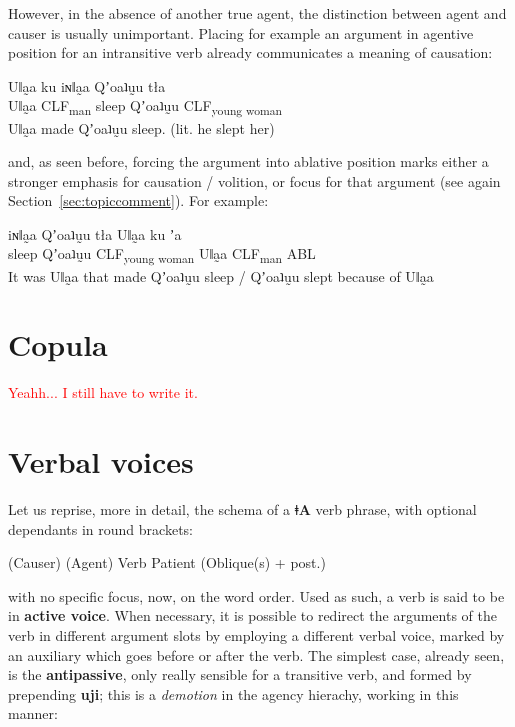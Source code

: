 \documentclass[11pt,a5paper]{book}
\newcommand{\qcn}[1]{\textcolor{AccentText}{\large\textbf{#1}}}
\newcommand{\langname}{\qcn{ǂA}}
\newcommand{\grammsc}[1]{\textsc{#1}}
\newcommand{\CLF}[1]{\grammsc{CLF}\textsubscript{#1}}
\newcommand{\cmnt}[1]{\textcolor{red}{#1}}
\begin{document}
However, in the absence of another true agent, the distinction between agent and causer is usually unimportant. Placing for example an argument in agentive position for an intransitive verb already communicates a meaning of causation:

\begin{exe}
\ex
\gll Uǁa̰a ku iɴǁa̰a Qʼoaʇṵu tła\\
Uǁa̰a \CLF{man} sleep Qʼoaʇṵu \CLF{young woman}\\
\glt Uǁa̰a made Qʼoaʇṵu sleep. (lit. he slept her)
\end{exe}

and, as seen before, forcing the argument into ablative position marks either a stronger emphasis for causation / volition, or focus for that argument (see again Section~\ref{sec:topiccomment}). For example:

\begin{exe}
\ex
\gll iɴǁa̰a Qʼoaʇṵu tła  Uǁa̰a ku ʼa\\
 sleep Qʼoaʇṵu \CLF{young woman} Uǁa̰a \CLF{man} ABL\\
\glt It was Uǁa̰a that made Qʼoaʇṵu sleep / Qʼoaʇṵu slept because of Uǁa̰a
\end{exe}

\section{Copula}\label{sec:copula}

\cmnt{Yeahh... I still have to write it.}

\section{Verbal voices}\label{sec:valencychanging}

Let us reprise, more in detail, the schema of a \langname{} verb phrase, with optional dependants in round brackets:

\begin{center}
(Causer) (Agent) Verb Patient (Oblique(s) + post.)
\end{center}

with no specific focus, now, on the word order. Used as such, a verb is said to be in \textbf{active voice}. When necessary, it is possible to redirect the arguments of the verb in different argument slots by employing a different verbal voice, marked by an auxiliary which goes before or after the verb. The simplest case, already seen, is the \textbf{antipassive}, only really sensible for a transitive verb, and formed by prepending \qcn{uji}; this is a \emph{demotion} in the agency hierachy, working in this manner:
\end{document}
